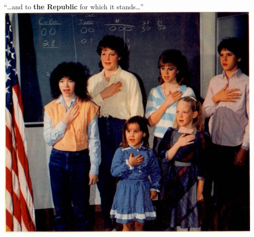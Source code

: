 \begin{frame}
    \centering
    \large{``\ldots and to \textbf{the Republic} for which it stands\ldots''} \\
    \includegraphics[width=.9\textwidth]{img/pledge.jpg} \\
\end{frame}

